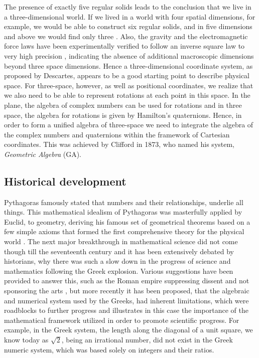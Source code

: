 \documentclass[prb,preprint]{revtex4}
\begin{document}
The presence of exactly five regular solids leads to the conclusion that we live in a three-dimensional world. If we lived in a world with four spatial dimensions, for example, we would be able to construct six regular solids, and in five dimensions and above we would find only three \cite{coxeter1973regular}. Also, the gravity and the electromagnetic force laws have been experimentally verified to follow an inverse square law to very high precision \cite{hoyle2001submillimeter}, indicating the absence of additional macroscopic dimensions beyond three space dimensions.
Hence a three-dimensional coordinate system, as proposed by Descartes, appears to be a good starting point to describe physical space. For three-space, however, as well as positional coordinates, we realize that we also need to be able to represent rotations at each point in this space. In the plane, the algebra of complex numbers can be used for rotations and in three space, the algebra for rotations is given by Hamilton's quaternions.  
Hence, in order to form a unified algebra of three-space we need to integrate the algebra of the complex numbers and quaternions within the framework of Cartesian coordinates. This was achieved by Clifford in 1873, who named his system, {\it Geometric Algebra} (GA).

\subsection{Historical development}

Pythagoras famously stated that numbers and their relationships, underlie all things.  This mathematical idealism of Pythagoras was masterfully applied by Euclid, to geometry, deriving his famous set of geometrical theorems based on a few simple axioms that formed the first comprehensive theory for the physical world  \cite{Wedberg1982}.  
The next major breakthrough in mathematical science did not come though till the seventeenth century and it has been extensively debated by historians, why there was such a slow down in the progress of science and mathematics following the Greek explosion.  Various suggestions have been provided to answer this, such as the Roman empire suppressing dissent and not sponsoring the arts \cite{Russel1945}, but more recently it has been proposed, that the algebraic and numerical system used by the Greeks, had inherent limitations, which were roadblocks to further progress \cite{Hestenes111}  and illustrates in this case the importance of the mathematical framework utilized in order to promote scientific progress.
For example, in the Greek system, the length along the diagonal of a unit square, we know today as $ \sqrt{2} $, being an irrational number, did not exist in the Greek numeric system, which was based solely on integers and their ratios. 
\end{document}
